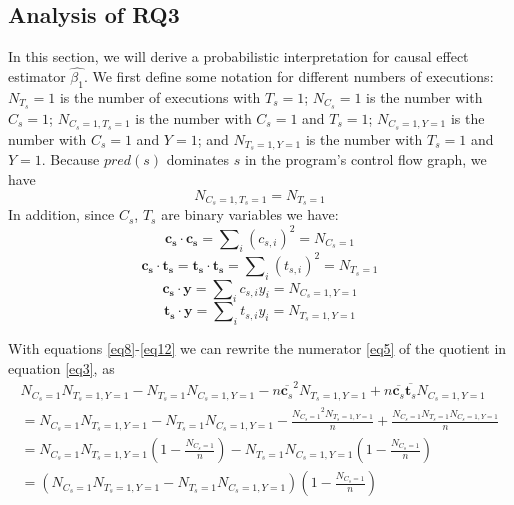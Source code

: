 \subsection{Analysis of RQ3}\label{sec3.3}
In this section, we will derive a probabilistic interpretation for causal effect estimator $\widehat{\beta_1}$.  
We first define some notation for different numbers of executions: $N_{T_s}=1$ is the number 
of executions with $T_s=1$; $N_{C_s}=1$ is the number with $C_s=1$; $N_{{C_s}=1,{T_s}=1}$ 
is the number with $C_s=1$ and $T_s=1$; $N_{{C_s}=1,Y=1}$ is the number with $C_s=1$ and $Y=1$; 
and $N_{{T_s}=1,Y=1}$ is the number with $T_s=1$ and $Y=1$.  Because $pred(s)$ dominates $s$ 
in the program’s control flow graph, we have
\begin{equation}\label{eq8}
N_{{C_s}=1,{T_s}=1}=N_{T_s=1}
\end{equation}
In addition, since $C_s$, $T_s$ are binary variables we have:
\begin{equation}\label{eq9}
{\mathbf{c_s}} \cdot {\mathbf{c_s}} = {\sum\nolimits_i {({c_{s,i}})} ^2} = {N_{C_s = 1}}
\end{equation}
\begin{equation}\label{eq10}
{\mathbf{c_s}} \cdot {\mathbf{t_s}} = {\mathbf{t_s}} \cdot {\mathbf{t_s}}
={\sum\nolimits_i {({t_{s,i}})} ^2} = {N_{T_s = 1}}
\end{equation}
\begin{equation}\label{eq11}
{\mathbf{c_s}} \cdot {\mathbf{y}} = {\sum\nolimits_i {c_{s,i}}y_i} = {N_{C_s= 1,Y=1}}
\end{equation}
\begin{equation}\label{eq12}
{\mathbf{t_s}} \cdot {\mathbf{y}} = {\sum\nolimits_i {t_{s,i}y_i}} = {N_{T_s= 1,Y=1}}
\end{equation}

With equations \eqref{eq8}-\eqref{eq12} we can rewrite the numerator \eqref{eq5} 
of the quotient in equation \eqref{eq3}, as
\begin{equation}\label{eq13}
\begin{array}{l}
N_{C_s=1}N_{T_s=1,Y=1}-N_{T_s=1}N_{C_s=1,Y=1}
-n{{\overline {\mathbf{c}_s}} ^2} N_{T_s=1,Y=1}
+n{\overline{\mathbf{c}_s}}{\overline{\mathbf{t}_s}}N_{C_s=1,Y=1}\\
=N_{C_s=1}N_{T_s=1,Y=1}-N_{T_s=1}N_{C_s=1,Y=1}
-\frac{{{N_{C_s=1}}^2}{N_{T_s=1,Y=1}}}{n}
+\frac{{N_{C_s=1}}{N_{T_s=1}}{N_{C_s=1,Y=1}}}{n}\\
=N_{C_s=1}N_{T_s=1,Y=1}(1-\frac{N_{C_s=1}}{n})-N_{T_s=1}N_{C_s=1,Y=1}(1-\frac{N_{C_s=1}}{n})\\
=(N_{C_s=1}N_{T_s=1,Y=1}-N_{T_s=1}N_{C_s=1,Y=1})(1-\frac{N_{C_s=1}}{n})
\end{array}
\end{equation}

